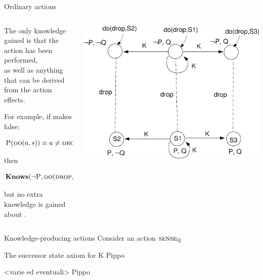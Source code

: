 \begin{frame}{Ordinary actions}
    \begin{columns}
        \begin{column}{0.5\textwidth}
            The only knowledge gained is that the \scdrop{} action has been performed,\\
            as well as anything that can be derived from the action effects.
            
            For example, if \scdrop{} makes \scp false:

            \[ \textsc{P}(\textsc{do}(a,s)) \equiv a \not = \textsc{drop} \land \textsc{P}(s) \]

            then

            \[ \textbf{Knows}(\lnot \textsc{P}, \textsc{do}(\textsc{drop}, S1)) \]

            but no extra knowledge is gained about \scq.
        \end{column}

        \begin{column}{0.5\textwidth}
            \includegraphics[width=\textwidth]{assets/3states_dropaction}
        \end{column}
    \end{columns}
\end{frame}

\begin{frame}{Knowledge-producing actions}
    Consider an action \( \textsc{sense}_{\textsc{Q}} \)
\end{frame}

\begin{frame}{The successor state axiom for K}
    Pippo
\end{frame}

\begin{frame}{<varie ed eventuali>}
    Pippo
\end{frame}
